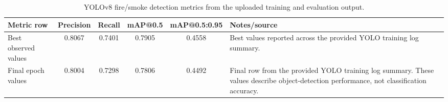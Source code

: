 \begin{table}[htbp]
\centering
\caption{YOLOv8 fire/smoke detection metrics from the uploaded training and evaluation output.}
\label{tab:yolo-detection-metrics}
\begin{tabularx}{\textwidth}{l c c c c X}
\toprule
Metric row & Precision & Recall & mAP@0.5 & mAP@0.5:0.95 & Notes/source \\
\midrule
Best observed values & 0.8067 & 0.7401 & 0.7905 & 0.4558 &
Best values reported across the provided YOLO training log summary. \\
Final epoch values & 0.8004 & 0.7298 & 0.7806 & 0.4492 &
Final row from the provided YOLO training log summary. These values describe
object-detection performance, not classification accuracy. \\
\bottomrule
\end{tabularx}
\end{table}
